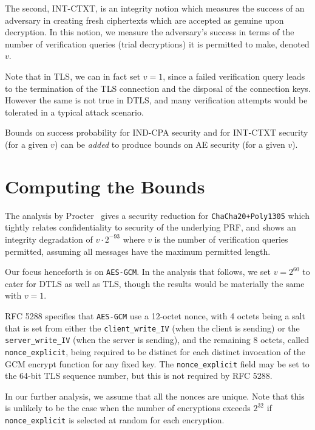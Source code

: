 \documentclass{article}
\begin{document}
The second, INT-CTXT, is an integrity notion which measures the success of an adversary in creating fresh ciphertexts which are accepted as genuine upon decryption. In this notion, we measure the adversary's success in terms of the number of verification queries (trial decryptions) it is permitted to make, denoted $v$. 

Note that in TLS, we can in fact set $v=1$, since a failed verification query leads to the termination of the TLS connection and the disposal of the connection keys. However the same is not true in DTLS, and many verification attempts would be tolerated in a typical attack scenario. 

Bounds on success probability for IND-CPA security and for INT-CTXT security (for a given $v$) can be \emph{added} to produce bounds on AE security (for a given $v$). 

\section{Computing the Bounds}

The analysis by Procter~\cite{cryptoeprint:2014:613} gives a security reduction for \texttt{ChaCha20+Poly1305} which tightly relates confidentiality to security of the underlying PRF, and shows an integrity degradation of $v \cdot 2^{-93}$ where $v$ is the number of verification queries permitted, assuming all messages have the maximum permitted length.


Our focus henceforth is on \texttt{AES-GCM}. In the analysis that follows, we set $v = 2^{60}$ to cater for DTLS as well as TLS, though the results would be materially the same with $v=1$.

RFC 5288 specifies that \texttt{AES-GCM} use a 12-octet nonce, with 4 octets being a salt that is set from either the \verb|client_write_IV| (when the client is sending) or the \verb|server_write_IV| (when the server is sending), and the remaining 8 octets, called \verb|nonce_explicit|, being required to be distinct for each distinct invocation of the GCM encrypt function for any fixed key. The  \verb|nonce_explicit| field may be set to the 64-bit TLS sequence number, but this is not required by RFC 5288. 

In our further analysis, we assume that all the nonces are unique. Note that this is unlikely to be the case when the number of encryptions exceeds $2^{32}$ if \verb|nonce_explicit| is selected at random for each encryption.
\end{document}
